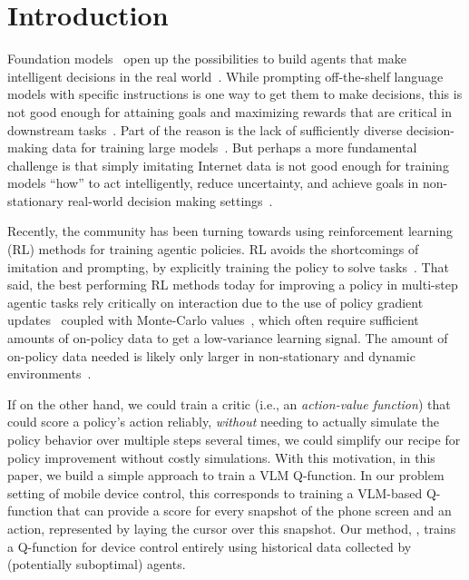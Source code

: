\vspace{-0.4cm}
\section{Introduction}
\vspace{-0.2cm}
Foundation models~\citep{openai2024gpt4technicalreport, geminiteam2024geminifamilyhighlycapable} open up the possibilities to build agents that make intelligent decisions in the real world~\citep{liu2023agentbenchevaluatingllmsagents}. While prompting off-the-shelf language models with specific instructions is one way to get them to make decisions, this is not good enough for attaining goals and maximizing rewards that are critical in downstream tasks~\citep{zeng2023agenttuningenablinggeneralizedagent, chen2023fireactlanguageagentfinetuning}. Part of the reason is the lack of sufficiently diverse decision-making data for training large models~\citep{gur2023understandinghtmllargelanguage}. But perhaps a more fundamental challenge is that simply imitating Internet data is not good enough for training models ``how'' to act intelligently, reduce uncertainty, and achieve goals in non-stationary real-world decision making settings~\citep{bai2024digirltraininginthewilddevicecontrol, ma2024cautionenvironmentmultimodalagents}.

Recently, the community has been turning towards using reinforcement learning (RL) methods for training agentic policies. RL avoids the shortcomings of imitation and prompting, by explicitly training the policy to solve tasks~\citep{zhou2024archertraininglanguagemodel, verma2022chaichatbotaitaskoriented, snell2023offlinerlnaturallanguage, abdulhai2023lmrlgymbenchmarksmultiturn}. That said, the best performing RL methods today for improving a policy in multi-step agentic tasks rely critically on interaction due to the use of policy gradient updates~\citep{yao2023webshopscalablerealworldweb} coupled with Monte-Carlo values~\citep{bai2024digirltraininginthewilddevicecontrol, putta2024agentqadvancedreasoning, shao2024deepseekmath},
which often require sufficient amounts of on-policy data to get a low-variance learning signal. The amount of on-policy data needed is likely only larger in non-stationary and dynamic environments~\citep{bai2024digirltraininginthewilddevicecontrol}. 

If on the other hand, we could train a critic (i.e., an \emph{action-value function}) that could score a policy's action reliably, \emph{without} needing to actually simulate the policy behavior over multiple steps several times, we could simplify our recipe for policy improvement without costly simulations. With this motivation, in this paper, we build a simple approach to train a VLM Q-function. In our problem setting of mobile device control, this corresponds to training a VLM-based Q-function that can provide a score for every snapshot of the phone screen and an action, represented by laying the cursor over this snapshot.
Our method, \ourmethod{}, trains a Q-function for device control entirely using historical data collected by (potentially suboptimal) agents.

